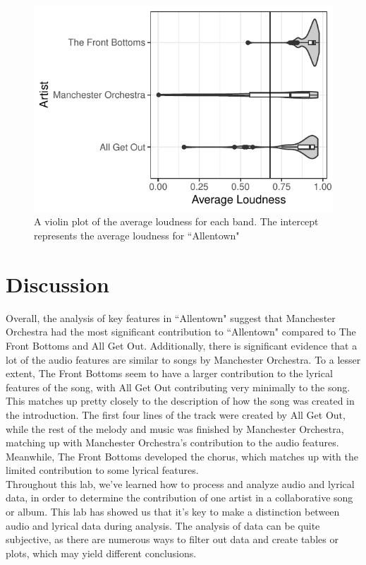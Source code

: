 \documentclass{article}\usepackage[]{graphicx}\usepackage[]{xcolor}
\makeatletter
\def\maxwidth{ %
  \ifdim\Gin@nat@width>\linewidth
    \linewidth
  \else
    \Gin@nat@width
  \fi
}
\newenvironment{knitrout}{}{} %
\makeatother
\begin{document}
\begin{multicols}{2}
\begin{figure}[H]
\begin{knitrout}
\includegraphics[width=\maxwidth]{figure/unnamed-chunk-2-1} 
\end{knitrout}
 \caption{A violin plot of the average loudness for each band. The intercept represents the average loudness for ``Allentown"}
 \label{plot2} %
 \end{figure}
\section{Discussion}
\indent Overall, the analysis of key features in ``Allentown" suggest that Manchester Orchestra had the most significant contribution to ``Allentown" compared to The Front Bottoms and All Get Out. Additionally, there is significant evidence that a lot of the audio features are similar to songs by Manchester Orchestra. To a lesser extent, The Front Bottoms seem to have a larger contribution to the lyrical features of the song, with All Get Out contributing very minimally to the song. \\
\indent This matches up pretty closely to the description of how the song was created in the introduction. The first four lines of the track were created by All Get Out, while the rest of the melody and music was finished by Manchester Orchestra, matching up with Manchester Orchestra's contribution to the audio features. Meanwhile, The Front Bottoms developed the chorus, which matches up with the limited contribution to some lyrical features. \\
\indent Throughout this lab, we've learned how to process and analyze audio and lyrical data, in order to determine the contribution of one artist in a collaborative song or album. This lab has showed us that it's key to make a distinction between audio and lyrical data during analysis. The analysis of data can be quite subjective, as there are numerous ways to filter out data and create tables or plots, which may yield different conclusions.
\pagebreak


\end{multicols}
\end{document}
